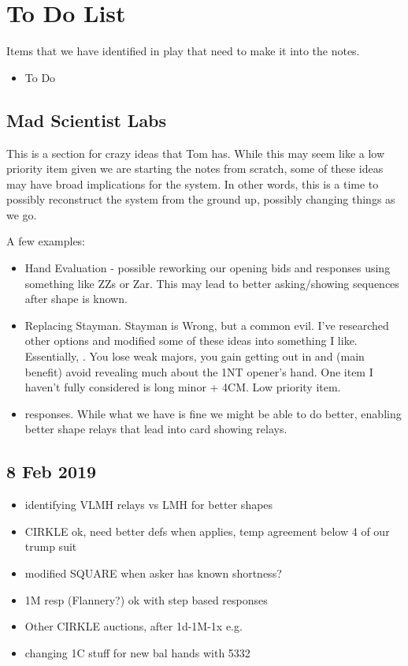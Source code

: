 \documentclass[tom-ari]{subfile}
\begin{document}
	
	\chapter{To Do List}
	
	Items that we have identified in play that need to make it into the notes.
	\begin{itemize}
		\item To Do
	\end{itemize}

	\section{Mad Scientist Labs}
	
	This is a section for crazy ideas that Tom has.  While this may seem like a low priority item given we are starting the notes from scratch, some of these ideas may have broad implications for the system.  In other words, this is a time to possibly reconstruct the system from the ground up, possibly changing things as we go.
	
	A few examples:
	
	\begin{itemize}
		\item Hand Evaluation - possible reworking our opening bids and responses using something like ZZs or Zar.  This may lead to better asking/showing sequences after shape is known.
		\item Replacing Stayman.  Stayman is Wrong, but a common evil.  I've researched other options and modified some of these ideas into something I like.  Essentially, \rightarrow{}.  You lose weak majors, you gain getting out in  and (main benefit) avoid revealing much about the 1NT opener's hand.  One item I haven't fully considered is long minor + 4CM.  Low priority item.
		\item {} responses.  While what we have is fine we might be able to do better, enabling better shape relays that lead into card showing relays.
	\end{itemize}

	\section{8 Feb 2019}
	\begin{itemize}
		\item identifying VLMH relays vs LMH for better shapes
		\item CIRKLE ok, need better defs when applies, temp agreement below 4 of our trump suit
		\item modified SQUARE when asker has known shortness?
		\item 1M resp (Flannery?) ok with step based responses 
		\item Other CIRKLE auctions, after 1d-1M-1x e.g.
		\item changing 1C stuff for new bal hands with 5332
	\end{itemize}
\end{document}
